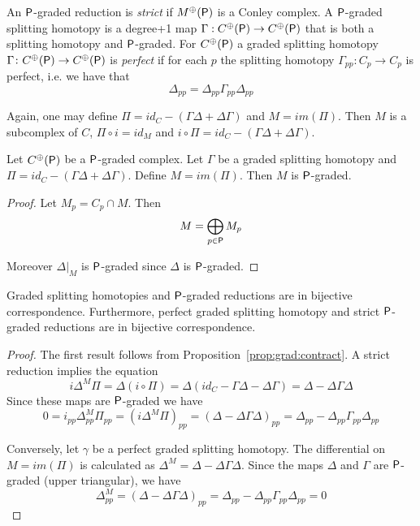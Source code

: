  An ${\mathsf P}$-graded reduction is {\em strict} if $M^\oplus({\mathsf P})$ is a Conley complex.  A ${\mathsf P}$-graded splitting homotopy is a degree+1 map $\Gamma:C^\oplus({\mathsf P})\to C^\oplus({\mathsf P})$ that is both a splitting homotopy and ${\mathsf P}$-graded.    For $C^\oplus({\mathsf P})$ a graded splitting homotopy $\Gamma\colon C^\oplus({\mathsf P})\to C^\oplus({\mathsf P})$ is {\em perfect} if for each $p$ the splitting homotopy $\Gamma_{pp}:C_p\to C_p$ is perfect, i.e. we have that $$\Delta_{pp} = \Delta_{pp}\Gamma_{pp}\Delta_{pp}$$  
  
 Again, one may define $\Pi=id_C-(\Gamma\Delta+\Delta\Gamma)$ and $M=im(\Pi)$.  Then $M$ is a subcomplex of $C$, $\Pi \circ i = id_M$ and $i\circ \Pi = id_C-(\Gamma\Delta+\Delta\Gamma)$.  
  
\begin{prop}\label{prop:grad:contract}
Let $C^\oplus({\mathsf P})$ be a ${\mathsf P}$-graded complex.  Let $\Gamma$ be a graded splitting homotopy and $\Pi = id_C-(\Gamma\Delta+\Delta\Gamma)$.  Define $M = im(\Pi)$.  Then $M$ is ${\mathsf P}$-graded.
\end{prop}
\begin{proof}
Let $M_p = C_p\cap M$.  Then $$M=\bigoplus_{p\in {\mathsf P}} M_p$$

Moreover $\Delta|_M$ is ${\mathsf P}$-graded since $\Delta$ is ${\mathsf P}$-graded.
\end{proof}

\begin{prop}
Graded splitting homotopies and ${\mathsf P}$-graded reductions are in bijective correspondence.  Furthermore, perfect graded splitting homotopy and strict ${\mathsf P}$-graded reductions are in bijective correspondence.
\end{prop}
\begin{proof}
The first result follows from Proposition~\ref{prop:grad:contract}.  A strict reduction implies the equation $$i\Delta^M\Pi = \Delta (i\circ \Pi) = \Delta(id_C-\Gamma\Delta-\Delta\Gamma) = \Delta-\Delta\Gamma\Delta$$  Since these maps are ${\mathsf P}$-graded we have $$0=i_{pp}\Delta^M_{pp}\Pi_{pp}= (i\Delta^M\Pi)_{pp}  =(\Delta-\Delta\Gamma\Delta)_{pp}= \Delta_{pp}-\Delta_{pp}\Gamma_{pp}\Delta_{pp}$$

Conversely, let $\gamma$ be a perfect graded splitting homotopy.  The differential on $M=im(\Pi)$ is calculated as $\Delta^M = \Delta-\Delta\Gamma\Delta$.  Since the maps $\Delta$ and $\Gamma$ are ${\mathsf P}$-graded (upper triangular), we have $$\Delta^M_{pp} = (\Delta-\Delta\Gamma\Delta)_{pp} = \Delta_{pp}-\Delta_{pp}\Gamma_{pp}\Delta_{pp} = 0$$
\end{proof}


